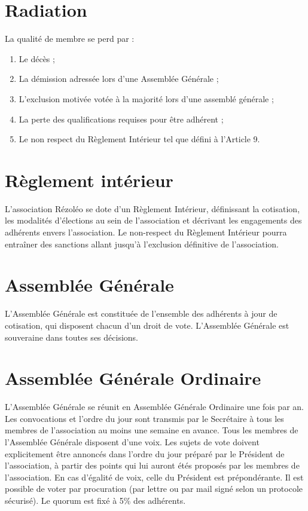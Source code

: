 \documentclass[12pt]{constitution}
\begin{document}
	\section{Radiation}
	La qualité de membre se perd par :
	\begin{enumerate}
		\item[\textbullet] Le décès ;
		\item[\textbullet] La démission adressée lors d'une Assemblée Générale ;
		\item[\textbullet] L'exclusion motivée votée à la majorité lors d'une assemblé générale ;
		\item[\textbullet] La perte des qualifications requises pour être adhérent ;
		\item[\textbullet] Le non respect du Règlement Intérieur tel que défini à l'Article 9.
	\end{enumerate}


	\section{Règlement intérieur}
	L'association Rézoléo se dote d'un Règlement Intérieur, définissant la cotisation, les modalités d'élections au sein de l'association et décrivant les engagements des adhérents envers l'association. Le non-respect du Règlement Intérieur pourra entraîner des sanctions allant jusqu'à l'exclusion définitive de l'association.

	\section{Assemblée Générale}
	L'Assemblée Générale est constituée de l'ensemble des adhérents à jour de cotisation, qui disposent chacun d'un droit de vote. L'Assemblée Générale est souveraine dans toutes ses décisions.

	\section{Assemblée Générale Ordinaire}
	L'Assemblée Générale se réunit en Assemblée Générale Ordinaire une fois par an. Les convocations et l'ordre du jour sont transmis par le Secrétaire à tous les membres de l'association au moins une semaine en avance. Tous les membres de l'Assemblée Générale disposent d'une voix. Les sujets de vote doivent explicitement être annoncés dans l'ordre du jour préparé par le Président de l'association, à partir des points qui lui auront étés proposés par les membres de l'association. En cas d'égalité de voix, celle du Président est prépondérante. Il est possible de voter par procuration (par lettre ou par mail signé selon un protocole sécurisé). Le quorum est fixé à 5\% des adhérents.
\end{document}
